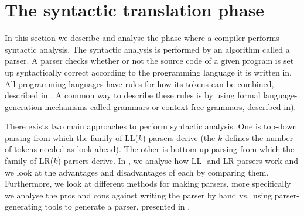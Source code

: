 \section{The syntactic translation phase}
\label{sec:syntacticanalysis}

In this section we describe and analyse the phase where a compiler
performs syntactic analysis. The syntactic analysis is performed
by an algorithm called a parser. A parser checks whether or not
the source code of a given program is set up syntactically correct
according to the programming language it is written in. All programming
languages have rules for how its tokens can be combined, described in
. A common way to describe these rules
is by using formal language-generation mechanisms called grammars or
context-free grammars, described in).

There exists two main approaches to perform syntactic analysis. One
is top-down parsing from which the family of LL($k$) parsers derive
(the $k$ defines the number of tokens needed as look ahead). The other
is bottom-up parsing from which the family of LR($k$) parsers derive.
In , we analyse how LL- and
LR-parsers work and we look at the advantages and disadvantages of each
by comparing them. Furthermore, we look at different methods for making
parsers, more specifically we analyse the pros and cons against writing
the parser by hand vs.\ using parser-generating tools to generate a
parser, presented in .





